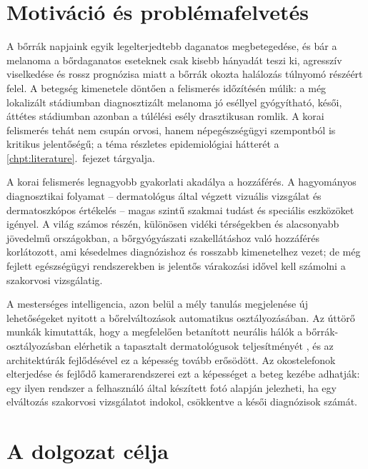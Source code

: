 
\section{Motiváció és problémafelvetés}

A bőrrák napjaink egyik legelterjedtebb daganatos megbetegedése, és bár a
melanoma a bőrdaganatos eseteknek csak kisebb hányadát teszi ki, agresszív
viselkedése és rossz prognózisa miatt a bőrrák okozta halálozás túlnyomó részéért felel.
A betegség kimenetele döntően a felismerés időzítésén múlik: a még lokalizált stádiumban
diagnosztizált melanoma jó eséllyel gyógyítható, késői, áttétes stádiumban
azonban a túlélési esély drasztikusan romlik. A korai felismerés tehát nem csupán
orvosi, hanem népegészségügyi szempontból is kritikus jelentőségű; a téma
részletes epidemiológiai hátterét a \ref{chpt:literature}.~fejezet tárgyalja.

A korai felismerés legnagyobb gyakorlati akadálya a hozzáférés. A hagyományos
diagnosztikai folyamat -- dermatológus által végzett vizuális vizsgálat és
dermatoszkópos értékelés -- magas szintű szakmai tudást és speciális eszközöket
igényel. A világ számos részén, különösen vidéki térségekben és alacsonyabb
jövedelmű országokban, a bőrgyógyászati szakellátáshoz való hozzáférés
korlátozott, ami késedelmes diagnózishoz és rosszabb kimenetelhez vezet; de még
fejlett egészségügyi rendszerekben is jelentős várakozási idővel kell számolni a
szakorvosi vizsgálatig.

A mesterséges intelligencia, azon belül a mély tanulás megjelenése új
lehetőségeket nyitott a bőrelváltozások automatikus osztályozásában. Az úttörő
munkák kimutatták, hogy a megfelelően betanított neurális hálók a
bőrrák-osztályozásban elérhetik a tapasztalt dermatológusok teljesítményét
\cite{esteva2017dermatologist}, és az architektúrák fejlődésével ez a képesség tovább erősödött.
Az okostelefonok elterjedése és fejlődő kamerarendszerei ezt a képességet a beteg
kezébe adhatják: egy ilyen rendszer a felhasználó által készített fotó alapján
jelezheti, ha egy elváltozás szakorvosi vizsgálatot indokol, csökkentve a
késői diagnózisok számát.

\section{A dolgozat célja}

